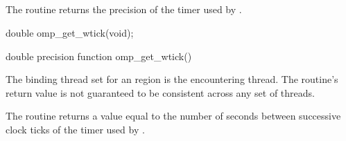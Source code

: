 \pagebreak
\subsection{}
\label{subsec:omp_get_wtick}
\summary
The  routine returns the precision of the timer used by 
.

\format
\begin{ccppspecific}
\begin{boxedcode}
double omp\_get\_wtick(void);
\end{boxedcode}
\end{ccppspecific}

\begin{fortranspecific}
\begin{boxedcode}
double precision function omp\_get\_wtick()
\end{boxedcode}
\end{fortranspecific}

\binding
The binding thread set for an  region is the encountering thread. The 
routine’s return value is not guaranteed to be consistent across any set of threads.

\effect
The  routine returns a value equal to the number of seconds between 
successive clock ticks of the timer used by .







